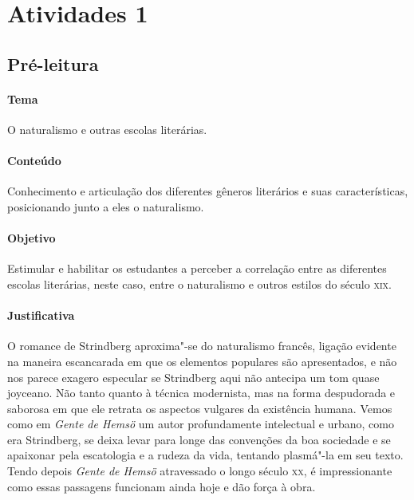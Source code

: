 \documentclass[12pt]{extarticle}
\begin{document}
\tableofcontents




\section{Atividades 1}


\subsection{Pré-leitura}


\paragraph{Tema} O naturalismo e outras escolas literárias.

\paragraph{Conteúdo} Conhecimento e articulação dos diferentes gêneros literários e 
suas características, posicionando junto a eles o naturalismo. 

\paragraph{Objetivo} Estimular e habilitar os estudantes a perceber a 
correlação entre as diferentes escolas literárias, neste caso, entre o naturalismo 
e outros estilos do século \textsc{xix}.

\paragraph{Justificativa} O romance de Strindberg aproxima"-se do naturalismo
francês, ligação evidente na maneira escancarada em que os elementos
populares são apresentados, e não nos parece exagero
especular se Strindberg aqui não antecipa um tom quase joyceano. 
Não tanto quanto à técnica modernista, mas na forma despudorada e saborosa em
que ele retrata os aspectos vulgares da existência humana.
Vemos como em \textit{Gente de Hemsö} um autor profundamente intelectual 
e urbano, como era Strindberg, se deixa levar para longe das convenções 
da boa sociedade e se apaixonar pela escatologia e a rudeza da vida,
tentando plasmá"-la em seu texto. Tendo depois \textit{Gente de Hemsö} 
atravessado o longo século \textsc{xx}, é impressionante como essas
passagens funcionam ainda hoje e dão força à obra. 
\end{document}
